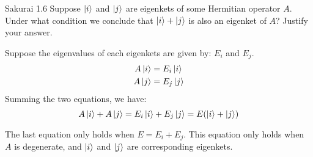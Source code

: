 \documentclass{article}
\begin{document}
\newpage
\begin{section}{Sakurai 1.6}
	Suppose $\ket{i}$ and $\ket{j}$ are eigenkets of some Hermitian operator $A$. Under what condition we conclude that $\ket{i} + \ket{j}$ is also an eigenket of $A$? Justify your answer.

	\begin{tcolorbox}
		Suppose the eigenvalues of each eigenkets are given by: $E_i$ and $E_j$. \begin{align*}
			A \ket{i} & = E_i \ket{i} \\
			A \ket{j} & = E_j \ket{j}
		\end{align*}
		Summing the two equations, we have:
		\begin{equation*}
			A \ket{i} + A \ket{j} = E_i \ket{i} + E_j \ket{j} = E (\ket{i} + \ket{j})
		\end{equation*}

		The last equation only holds when $E = E_i + E_j$. This equation only holds when $A$ is degenerate, and $\ket{i}$ and $\ket{j}$ are corresponding eigenkets.
	\end{tcolorbox}
\end{section}
\end{document}

